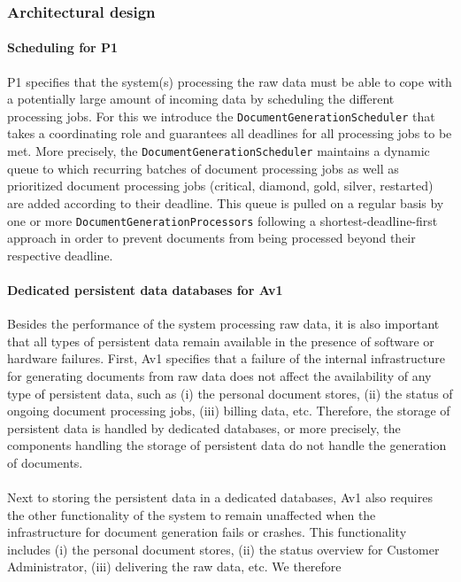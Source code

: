 \documentclass[a4paper,10pt]{article}
\begin{document}
\subsubsection{Architectural design}
\paragraph{Scheduling for P1}
P1 specifies that the system(s) processing the raw data must be able to cope with a potentially large amount of incoming data by scheduling the different processing jobs. For this we introduce the \texttt{DocumentGenerationScheduler} that takes a coordinating role and guarantees all deadlines for all processing jobs to be met. More precisely, the \texttt{DocumentGenerationScheduler} maintains a dynamic queue to which recurring batches of document processing jobs as well as prioritized document processing jobs (critical, diamond, gold, silver, restarted) are added according to their deadline. This queue is pulled on a regular basis by one or more \texttt{DocumentGenerationProcessors} following a shortest-deadline-first approach in order to prevent documents from being processed beyond their respective deadline.

\paragraph{Dedicated persistent data databases for Av1}
Besides the performance of the system processing raw data, it is also important that all types of persistent data remain available in the presence of software or hardware failures.
First, Av1 specifies that a failure of the internal infrastructure for generating documents from raw data does not affect the availability of any type of persistent data, such as (i) the personal document stores, (ii) the status of ongoing document processing jobs, (iii) billing data, etc. Therefore, the storage of persistent data is handled by dedicated databases, or more precisely, the components handling the storage of persistent data do not handle the generation of documents.

\paragraph{}
Next to storing the  persistent data in a dedicated databases, Av1 also requires the other functionality of the system to remain unaffected when the infrastructure for document generation fails or crashes. This functionality includes (i) the personal document stores, (ii) the status overview for Customer Administrator, (iii) delivering the raw data, etc.
We therefore 
\end{document}
